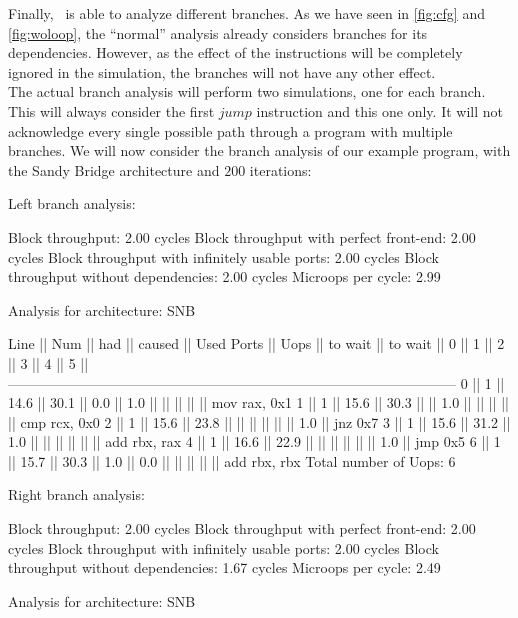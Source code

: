 Finally, \suaca\ is able to analyze different branches. As we have seen in \autoref{fig:cfg} and \autoref{fig:woloop}, the ``normal'' analysis already considers branches for its dependencies. However, as the effect of the instructions will be completely ignored in the simulation, the branches will not have any other effect.\\
The actual branch analysis will perform two simulations, one for each branch. This will always consider the first $jump$ instruction and this one only. It will not acknowledge every single possible path through a program with multiple branches. We will now consider the branch analysis of our example program, with the Sandy Bridge architecture and $200$ iterations:

\begin{example}
Left branch analysis:

Block throughput: 2.00 cycles
Block throughput with perfect front-end: 2.00 cycles
Block throughput with infinitely usable ports: 2.00 cycles
Block throughput without dependencies: 2.00 cycles
Microops per cycle: 2.99

Analysis for architecture: SNB

 Line  ||   Num   ||   had   || caused  ||            Used Ports
       ||   Uops  || to wait || to wait ||   0   ||   1   ||   2   ||   3   ||   4   ||   5   ||
 ------------------------------------------------------------------------------------------------
   0   ||    1    ||  14.6   ||  30.1   ||  0.0  ||  1.0  ||       ||       ||       ||       || mov rax, 0x1
   1   ||    1    ||  15.6   ||  30.3   ||       ||  1.0  ||       ||       ||       ||       || cmp rcx, 0x0
   2   ||    1    ||  15.6   ||  23.8   ||       ||       ||       ||       ||       ||  1.0  || jnz 0x7
   3   ||    1    ||  15.6   ||  31.2   ||  1.0  ||       ||       ||       ||       ||       || add rbx, rax
   4   ||    1    ||  16.6   ||  22.9   ||       ||       ||       ||       ||       ||  1.0  || jmp 0x5
   6   ||    1    ||  15.7   ||  30.3   ||  1.0  ||  0.0  ||       ||       ||       ||       || add rbx, rbx
Total number of Uops: 6


Right branch analysis:

Block throughput: 2.00 cycles
Block throughput with perfect front-end: 2.00 cycles
Block throughput with infinitely usable ports: 2.00 cycles
Block throughput without dependencies: 1.67 cycles
Microops per cycle: 2.49

Analysis for architecture: SNB


\end{example}
